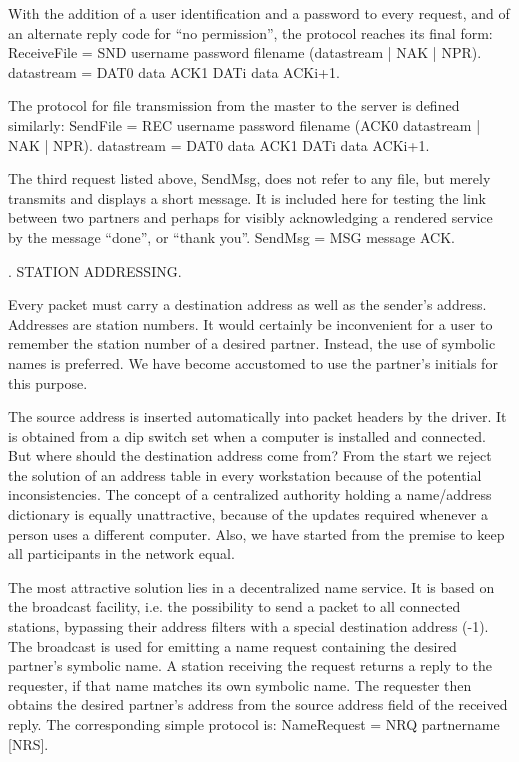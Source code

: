 With the addition of a user identification and a password to every request, and of an alternate reply code  for ``no permission'', the protocol reaches its final form:
\begintt
ReceiveFile = SND username password filename (datastream | NAK | NPR).
datastream = DAT0 data ACK1 {DATi data ACKi+1}.
\endtt

\noindent The protocol for file transmission from the master to the server is defined similarly:
\begintt
SendFile = REC username password filename (ACK0 datastream | NAK | NPR).
datastream = DAT0 data ACK1 {DATi data ACKi+1}.
\endtt

\noindent The third request listed above, SendMsg, does not refer to any file, but merely transmits and displays a short message. It is included here for testing the link between two partners and perhaps for visibly acknowledging a rendered service by the message ``done'', or ``thank you''.
\begintt
SendMsg = MSG message ACK.
\endtt

. STATION ADDRESSING.

Every packet must carry a destination address as well as the sender's address. Addresses are station numbers. It would certainly be inconvenient for a user to remember the station number of a desired partner. Instead, the use of symbolic names is preferred. We have become accustomed to use the partner's initials for this purpose.

The source address is inserted automatically into packet headers by the driver. It is obtained from a dip switch set when a computer is installed and connected. But where should the destination address come from? From the start we reject the solution of an address table in every workstation because of the potential inconsistencies. The concept of a centralized authority holding a name/address dictionary is equally unattractive, because of the updates required whenever a person uses a different computer. Also, we have started from the premise to keep all participants in the network equal.

The most attractive solution lies in a decentralized name service. It is based on the broadcast facility, i.e. the possibility to send a packet to all connected stations, bypassing their address filters with a special destination address (-1). The broadcast is used for emitting a name request containing the desired partner's symbolic name. A station receiving the request returns a reply to the requester, if that name matches its own symbolic name. The requester then obtains the desired partner's address from the source address field of the received reply. The corresponding simple protocol is:
\begintt
NameRequest = NRQ partnername [NRS].
\endtt

